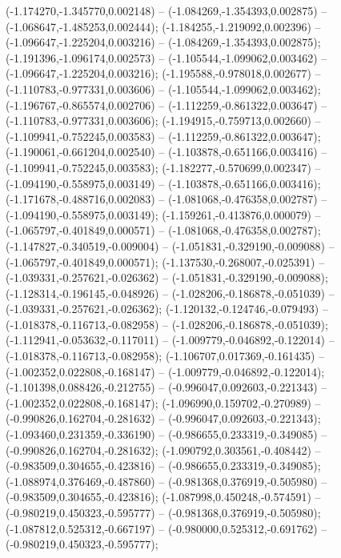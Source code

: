  (-1.174270,-1.345770,0.002148) -- (-1.084269,-1.354393,0.002875) -- (-1.068647,-1.485253,0.002444);
 (-1.184255,-1.219092,0.002396) -- (-1.096647,-1.225204,0.003216) -- (-1.084269,-1.354393,0.002875);
 (-1.191396,-1.096174,0.002573) -- (-1.105544,-1.099062,0.003462) -- (-1.096647,-1.225204,0.003216);
 (-1.195588,-0.978018,0.002677) -- (-1.110783,-0.977331,0.003606) -- (-1.105544,-1.099062,0.003462);
 (-1.196767,-0.865574,0.002706) -- (-1.112259,-0.861322,0.003647) -- (-1.110783,-0.977331,0.003606);
 (-1.194915,-0.759713,0.002660) -- (-1.109941,-0.752245,0.003583) -- (-1.112259,-0.861322,0.003647);
 (-1.190061,-0.661204,0.002540) -- (-1.103878,-0.651166,0.003416) -- (-1.109941,-0.752245,0.003583);
 (-1.182277,-0.570699,0.002347) -- (-1.094190,-0.558975,0.003149) -- (-1.103878,-0.651166,0.003416);
 (-1.171678,-0.488716,0.002083) -- (-1.081068,-0.476358,0.002787) -- (-1.094190,-0.558975,0.003149);
 (-1.159261,-0.413876,0.000079) -- (-1.065797,-0.401849,0.000571) -- (-1.081068,-0.476358,0.002787);
 (-1.147827,-0.340519,-0.009004) -- (-1.051831,-0.329190,-0.009088) -- (-1.065797,-0.401849,0.000571);
 (-1.137530,-0.268007,-0.025391) -- (-1.039331,-0.257621,-0.026362) -- (-1.051831,-0.329190,-0.009088);
 (-1.128314,-0.196145,-0.048926) -- (-1.028206,-0.186878,-0.051039) -- (-1.039331,-0.257621,-0.026362);
 (-1.120132,-0.124746,-0.079493) -- (-1.018378,-0.116713,-0.082958) -- (-1.028206,-0.186878,-0.051039);
 (-1.112941,-0.053632,-0.117011) -- (-1.009779,-0.046892,-0.122014) -- (-1.018378,-0.116713,-0.082958);
 (-1.106707,0.017369,-0.161435) -- (-1.002352,0.022808,-0.168147) -- (-1.009779,-0.046892,-0.122014);
 (-1.101398,0.088426,-0.212755) -- (-0.996047,0.092603,-0.221343) -- (-1.002352,0.022808,-0.168147);
 (-1.096990,0.159702,-0.270989) -- (-0.990826,0.162704,-0.281632) -- (-0.996047,0.092603,-0.221343);
 (-1.093460,0.231359,-0.336190) -- (-0.986655,0.233319,-0.349085) -- (-0.990826,0.162704,-0.281632);
 (-1.090792,0.303561,-0.408442) -- (-0.983509,0.304655,-0.423816) -- (-0.986655,0.233319,-0.349085);
 (-1.088974,0.376469,-0.487860) -- (-0.981368,0.376919,-0.505980) -- (-0.983509,0.304655,-0.423816);
 (-1.087998,0.450248,-0.574591) -- (-0.980219,0.450323,-0.595777) -- (-0.981368,0.376919,-0.505980);
 (-1.087812,0.525312,-0.667197) -- (-0.980000,0.525312,-0.691762) -- (-0.980219,0.450323,-0.595777);
